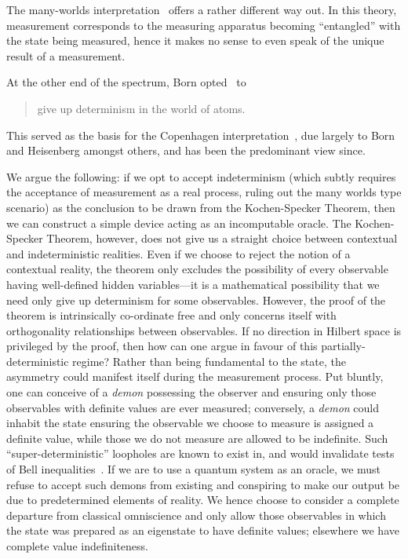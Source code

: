 \documentclass{comjnl}
\begin{document}
The many-worlds interpretation~\cite{everett} offers a rather different way out.
In this theory, measurement corresponds to the measuring apparatus becoming ``entangled'' with the state being measured, hence it makes no sense to even speak of the unique result of a measurement.

At the other end of the spectrum, Born opted~\cite{born-26-1} to
\begin{quote}
	give up determinism in the world of atoms.
\end{quote}
This served as the basis for the Copenhagen interpretation~\cite{wheeler-Zurek:83}, due largely to Born and Heisenberg amongst others, and has been the predominant view since.


We argue the following: if we opt to accept indeterminism (which subtly requires the acceptance of measurement as a real process, ruling out the many worlds type scenario) as the conclusion to be drawn from the Kochen-Specker Theorem, then we can construct a simple device acting as an incomputable oracle.
The Kochen-Specker Theorem, however, does not give us a straight choice between contextual and indeterministic realities.
Even if we choose to reject the notion of a contextual reality, the theorem only excludes the possibility of every observable having well-defined hidden variables---it is a mathematical possibility that we need only give up determinism for some observables.
However, the proof of the theorem is intrinsically co-ordinate free and only concerns itself with orthogonality relationships between observables.
If no direction in Hilbert space is privileged by the proof, then how can one argue in favour of this partially-deterministic regime?
Rather than being fundamental to the state, the asymmetry could manifest itself during the measurement process.
Put bluntly, one can conceive of a {\em demon} possessing the observer and ensuring only those observables with definite values are ever measured;
conversely,  a {\em demon} could inhabit the state ensuring the observable we choose to measure is assigned a definite value, while those we do not measure are allowed to be indefinite.
Such ``super-deterministic'' loopholes are known to exist in, and would invalidate tests of Bell inequalities~\cite{Pearle:1970fk,Hooft:2007fk}.
If we are to use a quantum system as an oracle, we must refuse to accept such demons from existing and conspiring to make our output be due to predetermined elements of reality.
We hence choose to consider a complete departure from classical omniscience and only allow those observables in which the state was prepared as an eigenstate to have definite values; elsewhere we have complete value indefiniteness.
\end{document}

